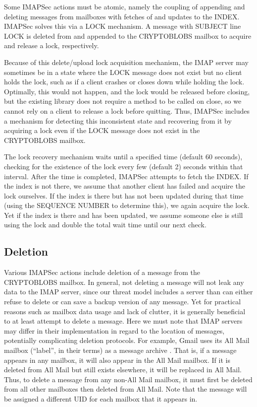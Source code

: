 \documentclass[pageno]{jpaper}
\newcommand{\project}{IMAPSec }
\begin{document}
Some \project actions must be atomic, namely the coupling of appending and deleting messages from mailboxes with fetches of and updates to the INDEX. \project solves this via a LOCK mechanism. A message with SUBJECT line LOCK is deleted from and appended to the CRYPTOBLOBS mailbox to acquire and release a lock, respectively.

Because of this delete/upload lock acquisition mechanism, the IMAP server may sometimes be in a state where the LOCK message does not exist but no client holds the lock, such as if a client crashes or closes down while holding the lock. Optimally, this would not happen, and the lock would be released before closing, but the existing library does not require a method to be called on close, so we cannot rely on a client to release a lock before quitting. Thus, \project includes a mechanism for detecting this inconsistent state and recovering from it by acquiring a lock even if the LOCK message does not exist in the CRYPTOBLOBS mailbox.

The lock recovery mechanism waits until a specified time (default 60 seconds), checking for the existence of the lock every few (default 2) seconds within that interval. After the time is completed, \project attempts to fetch the INDEX. If the index is not there, we assume that another client has failed and acquire the lock ourselves. If the index is there but has not been updated during that time (using the SEQUENCE NUMBER to determine this), we again acquire the lock. Yet if the index is there and has been updated, we assume someone else is still using the lock and double the total wait time until our next check.

\subsection{Deletion}
Various \project actions include deletion of a message from the CRYPTOBLOBS mailbox. In general, not deleting a message will not leak any data to the IMAP server, since our threat model includes a server than can either refuse to delete or can save a backup version of any message. Yet for practical reasons such as mailbox data usage and lack of clutter, it is generally beneficial to at least attempt to delete a message. Here we must note that IMAP servers may differ in their implementation in regard to the location of messages, potentially complicating deletion protocols. For example, Gmail uses its All Mail mailbox (``label'', in their terms) as a message archive \cite{allmail}. That is, if a message appears in any mailbox, it will also appear in the All Mail mailbox. If it is deleted from All Mail but still exists elsewhere, it will be replaced in All Mail. Thus, to delete a message from any non-All Mail mailbox, it must first be deleted from all other mailboxes then deleted from All Mail. Note that the message will be assigned a different UID for each mailbox that it appears in.
\end{document}
